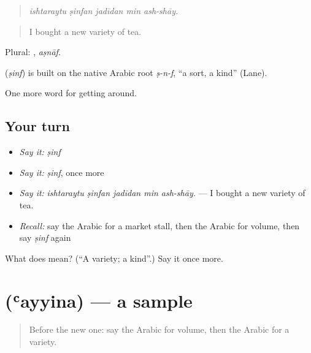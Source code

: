 \begin{quote}
\emph{ishtaraytu ṣinfan jadīdan min ash-shāy.}
\end{quote}

\begin{quote}
I bought a new variety of tea.
\end{quote}

Plural: , \emph{aṣnāf}.

\begin{cousinweb}
\textbf{} (\emph{ṣinf}) is built on the native Arabic root \emph{ṣ-n-f}, \textquotedblleft{}a sort, a kind\textquotedblright{} (Lane).
\end{cousinweb}

\begin{grammarlens}[title={What you've built}]
One more word for getting around.
\end{grammarlens}

\subsection*{Your turn}
\begin{itemize}
\raggedright
  \item \emph{Say it:} \emph{ṣinf}
  \item \emph{Say it:} \emph{ṣinf}, once more
  \item \emph{Say it:} \emph{ishtaraytu ṣinfan jadīdan min ash-shāy.} — I bought a new variety of tea.
  \item \emph{Recall:} say the Arabic for a market stall, then the Arabic for volume, then say \emph{ṣinf} again
\end{itemize}

\begin{tcolorbox}[breakable,colback=teal!4,colframe=teal!35!black,title={Before you move on}]
What does  mean? (\textquotedblleft{}A variety; a kind\textquotedblright{}.) Say it once more.
\end{tcolorbox}
\section[\texorpdfstring{\ar{عينة} (ʿayyina)}{عينة (ʿayyina)}]{ (ʿayyina) — a sample}

\label{lesson:AR-C456-ayyina}



\begin{quote}
Before the new one: say the Arabic for volume, then the Arabic for a variety.
\end{quote}


